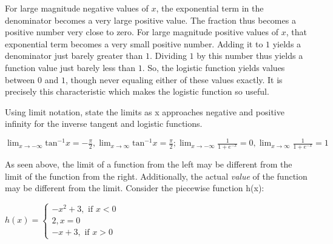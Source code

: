 
For large magnitude negative values of $x$, the exponential term in the denominator becomes a very large positive value. The fraction thus becomes a positive number very close to zero. For large magnitude positive values of $x$, that exponential term becomes a very small positive number. Adding it to $1$ yields a denominator just barely greater than $1$. Dividing $1$ by this number thus yields a function value just barely less than $1$. So, the logistic function yields values between $0$ and $1$, though never equaling either of these values exactly. It is precisely this characteristic which makes the logistic function so useful.

\begin{Exercise}[title=Limits Practice 3, label=limits3]
Using limit notation, state the limits as x approaches negative and positive infinity for the inverse tangent and logistic functions.
  \vspace{40mm}
\end{Exercise}
\begin{Answer}[ref=limits3] 
	$ \lim_{x \rightarrow -\infty} \text{tan}^{-1}x = -\frac{\pi}{2}, \lim_{x \rightarrow \infty} \text{tan}^{-1}x = \frac{\pi}{2}; \lim_{x \rightarrow -\infty} \frac{1}{1 + e^{-x}} = 0, \lim_{x \rightarrow \infty} \frac{1}{1 + e^{-x}} = 1 $
\end{Answer}


As seen above, the limit of a function from the left may be different from the limit of the function from the right. Additionally, the actual \textit{value} of the function may be different from the limit. Consider the piecewise function h(x):

$h(x) = \begin{cases}
    -x^2+3, \text{ if } x < 0\\
    2, x=0\\
    -x+3, \text{ if } x > 0
\end{cases}$

